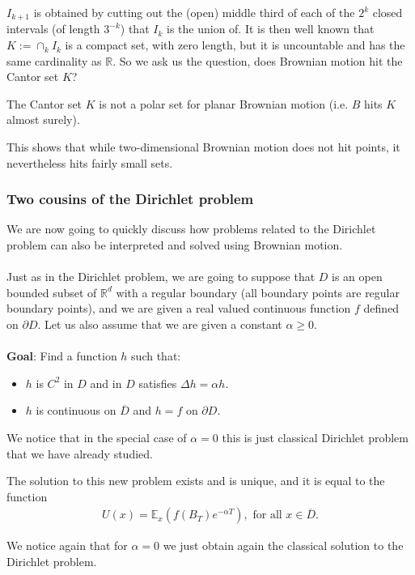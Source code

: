 \documentclass[../mainfile.tex]{subfiles}
\begin{document}
$I_{k+1}$ is obtained by cutting out the (open) middle third of each of the $2^k$ closed intervals (of length $3^{-k}$) that $I_k$ is the union of. It is then well known that $K:= \cap_{k}I_k$ is a compact set, with zero length, but it is uncountable and has the same cardinality as $\mathbb{R}$. 
\newpage
So we ask us the question, does Brownian motion hit the Cantor set $K$?
\begin{prop} The Cantor set $K$ is not a polar set for planar Brownian motion (i.e. $B$ hits $K$ almost surely). 
\end{prop}
This shows that while two-dimensional Brownian motion does not hit points, it nevertheless hits fairly small sets. 
\subsubsection{Two cousins of the Dirichlet problem}
We are now going to quickly discuss how problems related to the Dirichlet problem can also be interpreted and solved using Brownian motion. 
\\\\
Just as in the Dirichlet problem,  we are going to suppose that $D$ is an open bounded subset of $\mathbb{R}^d$ with a regular boundary (all boundary points are regular boundary points), and we are given a real valued continuous function $f$ defined on $\partial D$. Let us also assume that we are given a constant $\alpha \geq 0$. 
\\
\\
\textbf{Goal}: Find a function $h$ such that:
\begin{itemize}
\item $h$ is $C^2$ in $D$ and in $D$ satisfies $\Delta h = \alpha h$.
\item $h$ is continuous on $\overline{D}$ and $h=f$ on $\partial D$. 
\end{itemize}
\begin{rem} We notice that in the special case of $\alpha =0$ this is just classical Dirichlet problem that we have already studied. 
\end{rem}
\begin{prop}The solution to this new problem exists and is unique,  and it is equal to the function 
\begin{align*}
U(x) = \mathbb{E}_x(f(B_T)e^{ - \alpha T}), \text{ for all } x \in \overline{D}.
\end{align*}
\end{prop}
\begin{rem} We notice again that for $\alpha=0$ we just obtain again the classical solution to the Dirichlet problem.
\end{rem}
\end{document}
